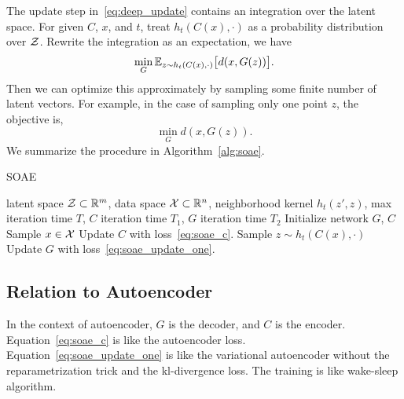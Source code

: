 The update step in~\eqref{eq:deep_update} contains an integration over the latent space.
For given \(C\), \(x\), and \(t\),
treat \(h_t(C(x), \cdot)\) as a probability distribution over \(\mathcal{Z}\).
Rewrite the integration as an expectation,
we have
\begin{equation}\label{eq:soae_update}
    \min_G \mathbb{E}_{z\sim h_t(C(x), \cdot)}\big[d(x, G(z))\big].
\end{equation}
Then we can optimize this approximately by sampling some finite number of latent vectors.
For example,
in the case of sampling only one point \(z\),
the objective is,
\begin{equation}\label{eq:soae_update_one}
    \min_G d(x, G(z)).
\end{equation}
We summarize the procedure in Algorithm~\ref{alg:soae}.

\begin{algorithm}[tb]
    \caption{SOAE}\label{alg:soae}
 \begin{algorithmic}
        latent space \(\mathcal{Z}\subset{\mathbb{R}}^m\),
        data space \(\mathcal{X}\subset{\mathbb{R}}^n\),
        neighborhood kernel \(h_t(z',z)\),
        max iteration time \(T\),
        \(C\) iteration time \(T_1\),
        \(G\) iteration time \(T_2\)
    \STATE
    \STATE Initialize network \(G\), \(C\)
        \STATE Sample \(x\in\mathcal{X}\)
        \STATE Update \(C\) with loss~\eqref{eq:soae_c}.
    \ENDFOR
        \STATE Sample \(z\sim h_t(C(x), \cdot)\)
        \STATE Update \(G\) with loss~\eqref{eq:soae_update_one}.
    \ENDFOR
    \ENDFOR
\end{algorithmic}
\end{algorithm}

\subsection{Relation to Autoencoder}

In the context of autoencoder,
\(G\) is the decoder,
and \(C\) is the encoder.
Equation~\eqref{eq:soae_c} is like the autoencoder loss.
Equation~\eqref{eq:soae_update_one} is like the variational autoencoder without the reparametrization trick and the kl-divergence loss.
The training is like wake-sleep algorithm.
